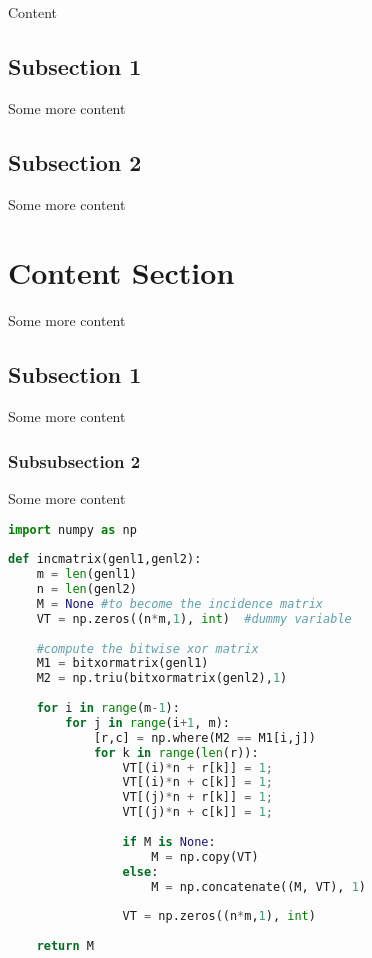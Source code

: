 \documentclass[12pt]{article} %
\begin{document}
Content 

\subsection{Subsection 1} %
Some more content

\subsection{Subsection 2} %

Some more content


\section{Content Section} %

Some more content

\subsection{Subsection 1} %

Some more content

\subsubsection{Subsubsection 2} %

Some more content

\begin{lstlisting}[language=Python]
import numpy as np
 
def incmatrix(genl1,genl2):
    m = len(genl1)
    n = len(genl2)
    M = None #to become the incidence matrix
    VT = np.zeros((n*m,1), int)  #dummy variable
 
    #compute the bitwise xor matrix
    M1 = bitxormatrix(genl1)
    M2 = np.triu(bitxormatrix(genl2),1) 
 
    for i in range(m-1):
        for j in range(i+1, m):
            [r,c] = np.where(M2 == M1[i,j])
            for k in range(len(r)):
                VT[(i)*n + r[k]] = 1;
                VT[(i)*n + c[k]] = 1;
                VT[(j)*n + r[k]] = 1;
                VT[(j)*n + c[k]] = 1;
 
                if M is None:
                    M = np.copy(VT)
                else:
                    M = np.concatenate((M, VT), 1)
 
                VT = np.zeros((n*m,1), int)
 
    return M
\end{lstlisting}
\end{document}
